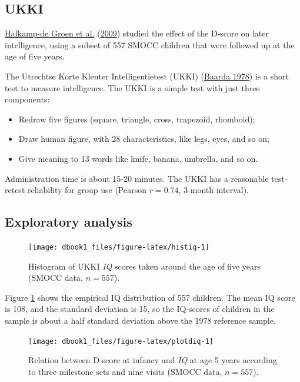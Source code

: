 \documentclass[
]{book}
\begin{document}
\hypertarget{ukki}{%
\subsection{UKKI}\label{ukki}}

\protect\hyperlink{ref-hafkamp2009}{Hafkamp-de Groen et al.} (\protect\hyperlink{ref-hafkamp2009}{2009}) studied the effect of the D-score on later intelligence, using a subset of 557 SMOCC children that were followed up at the age of five years.

The Utrechtse Korte Kleuter Intelligentietest (UKKI) (\protect\hyperlink{ref-baarda1978}{Baarda 1978}) is a short test to measure intelligence. The UKKI is a simple test with just three components:

\begin{itemize}
\item
  Redraw five figures (square, triangle, cross, trapezoid, rhomboid);
\item
  Draw human figure, with 28 characteristics, like legs, eyes, and so on;
\item
  Give meaning to 13 words like knife, banana, umbrella, and so on.
\end{itemize}

Administration time is about 15-20 minutes. The UKKI has a reasonable test-retest reliability for group use (Pearson \(r = 0.74\), 3-month interval).

\hypertarget{exploratory-analysis}{%
\subsection{Exploratory analysis}\label{exploratory-analysis}}

\begin{figure}

{\centering \texttt{[image: dbook1\_files/figure-latex/histiq-1]} 

}

\caption{Histogram of UKKI \emph{IQ} scores taken around the age of five years (SMOCC data, \(n = 557\)).}\label{fig:histiq}
\end{figure}



Figure \ref{fig:histiq} shows the empirical IQ distribution of 557 children. The mean IQ score is 108, and the standard deviation is 15, so the IQ-scores of children in the sample is about a half standard deviation above the 1978 reference sample.

\begin{figure}

{\centering \texttt{[image: dbook1\_files/figure-latex/plotdiq-1]} 

}

\caption{Relation between D-score at infancy and \emph{IQ} at age 5 years according to three milestone sets and nine visits (SMOCC data, \(n = 557\)).}\label{fig:plotdiq}
\end{figure}
\end{document}
